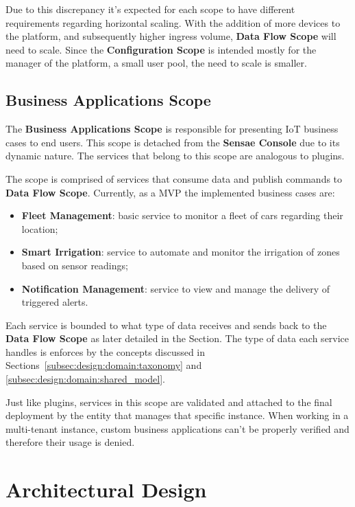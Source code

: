 Due to this discrepancy it's expected for each scope to have different requirements regarding horizontal scaling. With the addition of more devices to the platform, and subsequently higher ingress volume, \textbf{Data Flow Scope} will need to scale. Since the \textbf{Configuration Scope} is intended mostly for the manager of the platform, a small user pool, the need to scale is smaller.

\subsection{Business Applications Scope}
\label{subsec:design:system_scopes:service_scope}

The \textbf{Business Applications Scope} is responsible for presenting \gls{IoT} business cases to end users. This scope is detached from the \textbf{Sensae Console} due to its dynamic nature. The services that belong to this scope are analogous to plugins.

The scope is comprised of services that consume data and publish commands to \textbf{Data Flow Scope}. Currently, as a \gls{MVP} the implemented business cases are:

\begin{itemize}
   \item \textbf{Fleet Management}: basic service to monitor a fleet of cars regarding their location;
   \item \textbf{Smart Irrigation}: service to automate and monitor the irrigation of zones based on sensor readings;
   \item \textbf{Notification Management}: service to view and manage the delivery of triggered alerts.
\end{itemize}

Each service is bounded to what type of data receives and sends back to the \textbf{Data Flow Scope} as later detailed in the  Section. The type of data each service handles is enforces by the concepts discussed in Sections~\ref{subsec:design:domain:taxonomy} and \ref{subsec:design:domain:shared_model}.

Just like plugins, services in this scope are validated and attached to the final deployment by the entity that manages that specific instance. When working in a multi-tenant instance, custom business applications can't be properly verified and therefore their usage is denied.

\section{Architectural Design}
\label{sec:design:architecture}

